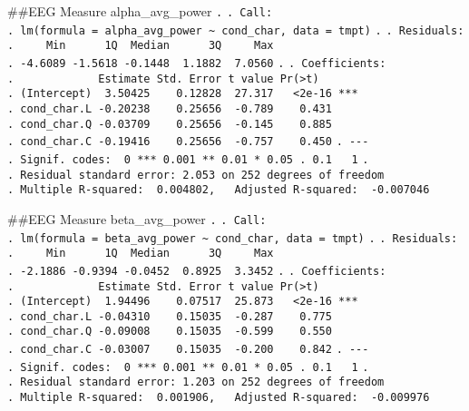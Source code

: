 \documentclass[
]{article}
\begin{document}
\#\#EEG Measure alpha\_avg\_power \texttt{.} \texttt{.\ Call:}
\texttt{.\ lm(formula\ =\ alpha\_avg\_power\ \textasciitilde{}\ cond\_char,\ data\ =\ tmpt)}
\texttt{.} \texttt{.\ Residuals:}
\texttt{.\ \ \ \ \ Min\ \ \ \ \ \ 1Q\ \ Median\ \ \ \ \ \ 3Q\ \ \ \ \ Max}
\texttt{.\ -4.6089\ -1.5618\ -0.1448\ \ 1.1882\ \ 7.0560} \texttt{.}
\texttt{.\ Coefficients:}
\texttt{.\ \ \ \ \ \ \ \ \ \ \ \ \ Estimate\ Std.\ Error\ t\ value\ Pr(\textgreater{}\textbar{}t\textbar{})}
\texttt{.\ (Intercept)\ \ 3.50425\ \ \ \ 0.12828\ \ 27.317\ \ \ \textless{}2e-16\ ***}
\texttt{.\ cond\_char.L\ -0.20238\ \ \ \ 0.25656\ \ -0.789\ \ \ \ 0.431}
\texttt{.\ cond\_char.Q\ -0.03709\ \ \ \ 0.25656\ \ -0.145\ \ \ \ 0.885}
\texttt{.\ cond\_char.C\ -0.19416\ \ \ \ 0.25656\ \ -0.757\ \ \ \ 0.450}
\texttt{.\ -\/-\/-}
\texttt{.\ Signif.\ codes:\ \ 0\ \textquotesingle{}***\textquotesingle{}\ 0.001\ \textquotesingle{}**\textquotesingle{}\ 0.01\ \textquotesingle{}*\textquotesingle{}\ 0.05\ \textquotesingle{}.\textquotesingle{}\ 0.1\ \textquotesingle{}\ \textquotesingle{}\ 1}
\texttt{.}
\texttt{.\ Residual\ standard\ error:\ 2.053\ on\ 252\ degrees\ of\ freedom}
\texttt{.\ Multiple\ R-squared:\ \ 0.004802,\ \ \ Adjusted\ R-squared:\ \ -0.007046}

\#\#EEG Measure beta\_avg\_power \texttt{.} \texttt{.\ Call:}
\texttt{.\ lm(formula\ =\ beta\_avg\_power\ \textasciitilde{}\ cond\_char,\ data\ =\ tmpt)}
\texttt{.} \texttt{.\ Residuals:}
\texttt{.\ \ \ \ \ Min\ \ \ \ \ \ 1Q\ \ Median\ \ \ \ \ \ 3Q\ \ \ \ \ Max}
\texttt{.\ -2.1886\ -0.9394\ -0.0452\ \ 0.8925\ \ 3.3452} \texttt{.}
\texttt{.\ Coefficients:}
\texttt{.\ \ \ \ \ \ \ \ \ \ \ \ \ Estimate\ Std.\ Error\ t\ value\ Pr(\textgreater{}\textbar{}t\textbar{})}
\texttt{.\ (Intercept)\ \ 1.94496\ \ \ \ 0.07517\ \ 25.873\ \ \ \textless{}2e-16\ ***}
\texttt{.\ cond\_char.L\ -0.04310\ \ \ \ 0.15035\ \ -0.287\ \ \ \ 0.775}
\texttt{.\ cond\_char.Q\ -0.09008\ \ \ \ 0.15035\ \ -0.599\ \ \ \ 0.550}
\texttt{.\ cond\_char.C\ -0.03007\ \ \ \ 0.15035\ \ -0.200\ \ \ \ 0.842}
\texttt{.\ -\/-\/-}
\texttt{.\ Signif.\ codes:\ \ 0\ \textquotesingle{}***\textquotesingle{}\ 0.001\ \textquotesingle{}**\textquotesingle{}\ 0.01\ \textquotesingle{}*\textquotesingle{}\ 0.05\ \textquotesingle{}.\textquotesingle{}\ 0.1\ \textquotesingle{}\ \textquotesingle{}\ 1}
\texttt{.}
\texttt{.\ Residual\ standard\ error:\ 1.203\ on\ 252\ degrees\ of\ freedom}
\texttt{.\ Multiple\ R-squared:\ \ 0.001906,\ \ \ Adjusted\ R-squared:\ \ -0.009976}
\end{document}
